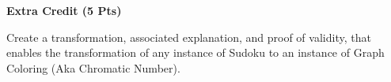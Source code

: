 \documentclass[12pt,letterpaper]{exam}
\begin{document}
\begin{questions}
\begin{parts}
\begin{solution}
		\end{solution}
	\end{parts}
	
	
	\question %
	\textbf{\large Extra Credit (5 Pts)}
	\begin{subparts}
		\subpart
		Create a transformation, associated explanation, and proof of validity, 
		that enables the transformation of any instance of Sudoku to an 
		instance of Graph Coloring (Aka Chromatic Number).
	\end{subparts}
	\begin{solution}
		
	\end{solution}
	
\end{questions}
\end{document}
